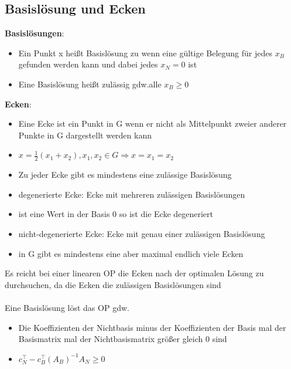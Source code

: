 \documentclass[12pt,a4paper, hyperref]{article}
\begin{document}
\subsection{Basislösung und Ecken}
\textbf{Basislösungen}:\\
\begin{itemize}
\item Ein Punkt x heißt Basislösung zu wenn eine gültige Belegung für jedes $x_B$ gefunden werden kann und dabei jedes $x_N=0$ ist\\
\item Eine Basislösung heißt zulässig gdw.alle $x_B\geq 0$
\end{itemize}
\textbf{Ecken}:\\
\begin{itemize}

\item Eine Ecke ist ein Punkt in G wenn er nicht als Mittelpunkt zweier anderer Punkte in G dargestellt werden kann
\item $x = \frac{1}{2} (x_1 + x_2 ), x_1 , x_2 \in G \Rightarrow x=x_1 = x_2$
\item Zu jeder Ecke gibt es mindestens eine zulässige Basislösung
\item degenerierte Ecke: Ecke mit mehreren zulässigen Basislösungen
\item ist eine Wert in der Basis 0 so ist die Ecke degeneriert
\item nicht-degenerierte Ecke: Ecke mit genau einer zulässigen Basislösung
\item in G gibt es mindestens eine aber maximal endlich viele Ecken
\end{itemize}
Es reicht bei einer linearen OP die Ecken nach der optimalen Lösung zu durchsuchen, da die Ecken die zulässigen Basislösungen sind\\
\hspace{1pt}\\
Eine Basislösung löst das OP gdw.
\begin{itemize}

\item Die Koeffizienten der Nichtbasis minus der Koeffizienten der Basis mal der Basismatrix mal der Nichtbasismatrix größer gleich 0 sind
\item $c_{N}^\intercal - c_{B}^\intercal (A_B)^{-1} A_N \geq 0$
\end{itemize}
\end{document}
